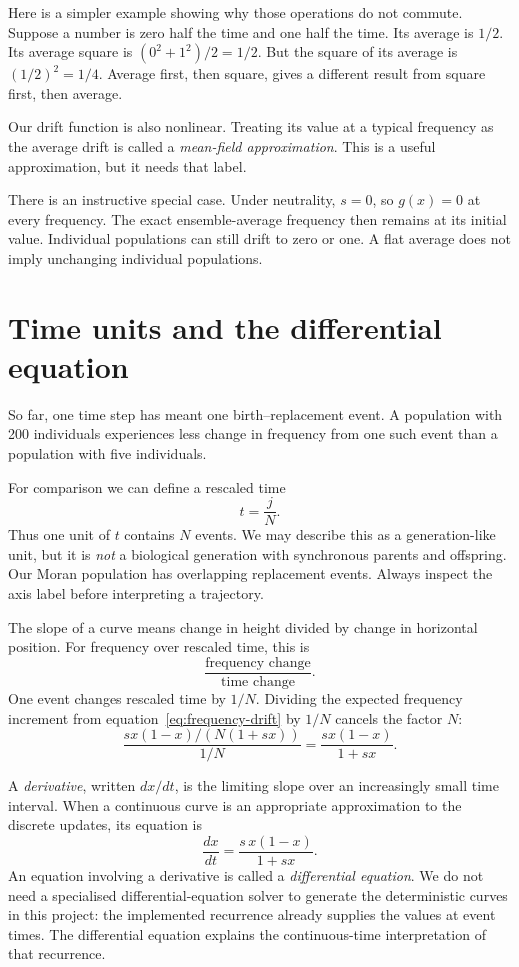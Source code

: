 Here is a simpler example showing why those operations do not commute. Suppose a number is zero half the time and one half the time. Its average is $1/2$. Its average square is $(0^2+1^2)/2=1/2$. But the square of its average is $(1/2)^2=1/4$. Average first, then square, gives a different result from square first, then average.

Our drift function is also nonlinear. Treating its value at a typical frequency as the average drift is called a \emph{mean-field approximation}. This is a useful approximation, but it needs that label.

There is an instructive special case. Under neutrality, $s=0$, so $g(x)=0$ at every frequency. The exact ensemble-average frequency then remains at its initial value. Individual populations can still drift to zero or one. A flat average does not imply unchanging individual populations.

\section{Time units and the differential equation}

So far, one time step has meant one birth--replacement event. A population with 200 individuals experiences less change in frequency from one such event than a population with five individuals.

For comparison we can define a rescaled time
\[
t=\frac{j}{N}.
\]
Thus one unit of $t$ contains $N$ events. We may describe this as a generation-like unit, but it is \emph{not} a biological generation with synchronous parents and offspring. Our Moran population has overlapping replacement events. Always inspect the axis label before interpreting a trajectory.

The slope of a curve means change in height divided by change in horizontal position. For frequency over rescaled time, this is
\[
\frac{\text{frequency change}}{\text{time change}}.
\]
One event changes rescaled time by $1/N$. Dividing the expected frequency increment from equation~\eqref{eq:frequency-drift} by $1/N$ cancels the factor $N$:
\[
\frac{s x(1-x)/(N(1+sx))}{1/N}
=\frac{s x(1-x)}{1+sx}.
\]

A \emph{derivative}, written $dx/dt$, is the limiting slope over an increasingly small time interval. When a continuous curve is an appropriate approximation to the discrete updates, its equation is
\begin{equation}
\frac{dx}{dt}=\frac{s\,x(1-x)}{1+sx}.
\label{eq:deterministic-ode}
\end{equation}
An equation involving a derivative is called a \emph{differential equation}. We do not need a specialised differential-equation solver to generate the deterministic curves in this project: the implemented recurrence already supplies the values at event times. The differential equation explains the continuous-time interpretation of that recurrence.

